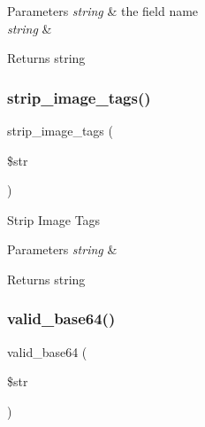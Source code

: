 \begin{DoxyParams}{Parameters}
{\em string} & the field name \\
\hline
{\em string} & \\
\hline
\end{DoxyParams}
\begin{DoxyReturn}{Returns}
string 
\end{DoxyReturn}
\mbox{\label{class_c_i___form__validation_abb836a42971c7bc641588db779c6ab1d}} 
\subsubsection{\texorpdfstring{strip\+\_\+image\+\_\+tags()}{strip\_image\_tags()}}
{\footnotesize\ttfamily strip\+\_\+image\+\_\+tags (\begin{DoxyParamCaption}\item[{}]{\$str }\end{DoxyParamCaption})}

Strip Image Tags


\begin{DoxyParams}{Parameters}
{\em string} & \\
\hline
\end{DoxyParams}
\begin{DoxyReturn}{Returns}
string 
\end{DoxyReturn}
\mbox{\label{class_c_i___form__validation_a9bec2f0a508e0327d4b048ecfc204522}} 
\subsubsection{\texorpdfstring{valid\+\_\+base64()}{valid\_base64()}}
{\footnotesize\ttfamily valid\+\_\+base64 (\begin{DoxyParamCaption}\item[{}]{\$str }\end{DoxyParamCaption})}

